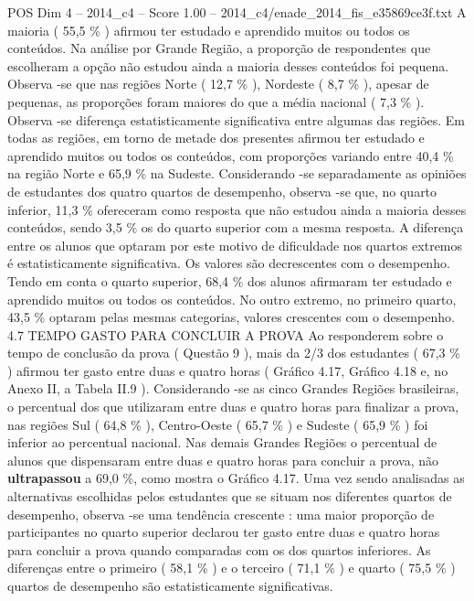 \begin{textsample}{POS Dim 4 – 2014\_c4 – Score 1.00 – 2014\_c4/enade\_2014\_fis\_e35869ce3f.txt}
A maioria ( 55,5 \% ) afirmou ter estudado e aprendido muitos ou todos os conteúdos.
Na análise por Grande Região, a proporção de respondentes que escolheram a opção não estudou ainda a maioria desses conteúdos foi pequena.
Observa -se que nas regiões Norte ( 12,7 \% ), Nordeste ( 8,7 \% ), apesar de pequenas, as proporções foram maiores do que a média nacional ( 7,3 \% ).
Observa -se diferença estatisticamente significativa entre algumas das regiões.
Em todas as regiões, em torno de metade dos presentes afirmou ter estudado e aprendido muitos ou todos os conteúdos, com proporções variando entre 40,4 \% na região Norte e 65,9 \% na Sudeste.
Considerando -se separadamente as opiniões de estudantes dos quatro quartos de desempenho, observa -se que, no quarto inferior, 11,3 \% ofereceram como resposta que não estudou ainda a maioria desses conteúdos, sendo 3,5 \% os do quarto superior com a mesma resposta.
A diferença entre os alunos que optaram por este motivo de dificuldade nos quartos extremos é estatisticamente significativa.
Os valores são decrescentes com o desempenho.
Tendo em conta o quarto superior, 68,4 \% dos alunos afirmaram ter estudado e aprendido muitos ou todos os conteúdos.
No outro extremo, no primeiro quarto, 43,5 \% optaram pelas mesmas categorias, valores crescentes com o desempenho. 4.7 TEMPO GASTO PARA CONCLUIR A PROVA Ao responderem sobre o tempo de conclusão da prova ( Questão 9 ), mais da 2/3 dos estudantes ( 67,3 \% ) afirmou ter gasto entre duas e quatro horas ( Gráfico 4.17, Gráfico 4.18 e, no Anexo II, a Tabela II.9 ).
Considerando -se as cinco Grandes Regiões brasileiras, o percentual dos que utilizaram entre duas e quatro horas para finalizar a prova, nas regiões Sul ( 64,8 \% ), Centro-Oeste ( 65,7 \% ) e Sudeste ( 65,9 \% ) foi inferior ao percentual nacional.
Nas demais Grandes Regiões o percentual de alunos que dispensaram entre duas e quatro horas para concluir a prova, não \textbf{ultrapassou} a 69,0 \%, como mostra o Gráfico 4.17.
Uma vez sendo analisadas as alternativas escolhidas pelos estudantes que se situam nos diferentes quartos de desempenho, observa -se uma tendência crescente : uma maior proporção de participantes no quarto superior declarou ter gasto entre duas e quatro horas para concluir a prova quando comparadas com os dos quartos inferiores.
As diferenças entre o primeiro ( 58,1 \% ) e o terceiro ( 71,1 \% ) e quarto ( 75,5 \% ) quartos de desempenho são estatisticamente significativas.

\end{textsample}
